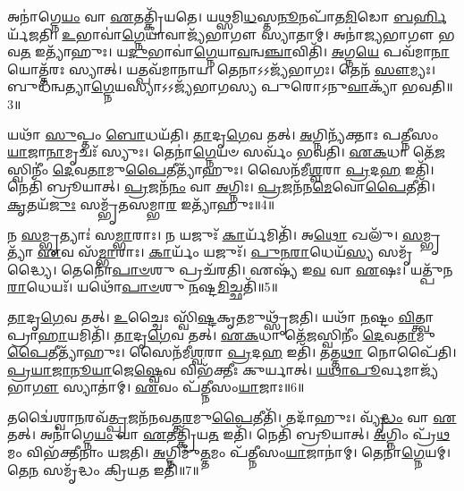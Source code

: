𑌅𑌨𑌾॑𑌗𑍍𑌨𑍇\-\ul{𑌯𑌂} 𑌵𑌾 \ul{𑌏}\-𑌤𑌤𑍍𑌕𑍍𑌰𑌿᳴𑌯𑌤𑍇।
𑌯\-\ul{𑌥𑍍𑌸}\-𑌮𑌿\-\ul{𑌧}\-𑌸𑍍𑌤\-\ul{𑌨𑍂}\-𑌨𑌪𑌾᳴𑌤\-\ul{𑌮𑌿}\-𑌡𑍋 \ul{𑌬}\-\-\ul{𑌰𑍍}\-\mbox{}𑌹𑌿𑌰𑍍𑌯᳴𑌜𑌤𑌿।
\-\ul{𑌉}\-𑌭𑌾𑌵𑌾॑\-\ul{𑌗𑍍𑌨𑍇}\-𑌯𑌾𑌵𑌾𑌜𑍍𑌯᳴𑌭𑌾𑌗𑍗 𑌸𑍍𑌯𑌾𑌤𑌾𑌮𑍍।
𑌅𑌨𑌾॑𑌜𑍍𑌯𑌭𑌾𑌗𑍗 𑌭𑌵\-\ul{𑌤} 𑌇𑌤𑍍𑌯𑌾᳴𑌹𑍁𑌃।
𑌯\-\ul{𑌦𑍁}\-𑌭𑌾𑌵𑌾॑\-\ul{𑌗𑍍𑌨𑍇}\-𑌯𑌾\-\ul{𑌵}\-𑌨𑍍𑌵\-\ul{𑌞𑍍𑌚𑌾}\-𑌵𑌿𑌤𑌿᳴।
\-\ul{𑌅}\-𑌗𑍍𑌨\-\ul{𑌯𑍇} 𑌪𑌵᳴𑌮𑌾\-\ul{𑌨𑌾}\-𑌯𑍋𑌤𑍍𑌤᳴𑌰𑌃 𑌸𑍍𑌯𑌾𑌤𑍍।
𑌯𑌤𑍍𑌪𑌵᳴𑌮𑌾𑌨𑌾𑌯।
𑌤𑍇𑌨𑌾𑌽𑌽𑌜𑍍𑌯᳴𑌭𑌾𑌗𑌃।
𑌤𑍇𑌨᳴ \ul{𑌸𑍗}\-𑌮𑍍𑌯𑌃।
𑌬𑍁𑌧᳴𑌨𑍍𑌵𑌤𑍍𑌯𑌾\-\ul{𑌗𑍍𑌨𑍇}\-𑌯𑌸𑍍𑌯𑌾𑌽𑌽𑌜𑍍𑌯᳴𑌭𑌾𑌗𑌸𑍍𑌯 𑌪𑍁𑌰𑍋\-𑌽𑌨𑍁\-\ul{𑌵𑌾}\-𑌕𑍍𑌯𑌾᳴ 𑌭𑌵𑌤𑌿॥3॥

𑌯𑌥𑌾᳴ \ul{𑌸𑍁}\-𑌪𑍍𑌤𑌂 \ul{𑌬𑍋}\-𑌧𑌯᳴𑌤𑌿।
\-\ul{𑌤𑌾}\-𑌦𑍃\-\ul{𑌗𑍇}\-𑌵 𑌤𑌤𑍍।
\-\ul{𑌅}\-𑌗𑍍𑌨𑌿𑌨𑍍𑌯᳴𑌕𑍍𑌤𑌾𑌃 𑌪𑌤𑍍𑌨𑍀𑌸𑌂\-\ul{𑌯𑌾}\-𑌜𑌾\-\ul{𑌨𑌾}\-𑌮𑍃𑌚𑌃᳴ 𑌸𑍍𑌯𑍁𑌃।
𑌤𑍇𑌨𑌾॑\-\ul{𑌗𑍍𑌨𑍇}\-𑌯𑍞 𑌸𑌰𑍍𑌵𑌂᳴ 𑌭𑌵𑌤𑌿।
\-\ul{𑌏}\-\-\ul{𑌕}\-𑌧𑌾 𑌤𑍇᳴\-\ul{𑌜}\-𑌸𑍍𑌵𑌿𑌨𑍀𑌂॑ \ul{𑌦𑍇}\-𑌵\-\ul{𑌤𑌾}\-𑌮𑍁\-\ul{𑌪𑍈}\-𑌤𑍀𑌤𑍍𑌯𑌾᳴𑌹𑍁𑌃।
𑌸𑍈𑌨᳴𑌮𑍀\-\ul{𑌶𑍍𑌵}\-𑌰𑌾 \ul{𑌪𑍍𑌰}\-𑌦\-\ul{𑌹} 𑌇𑌤𑌿᳴।
𑌨𑍇𑌤𑌿᳴ 𑌬𑍍𑌰𑍂𑌯𑌾𑌤𑍍।
\-\ul{𑌪𑍍𑌰}\-𑌜𑌨᳴\-\ul{𑌨𑌂} 𑌵𑌾 \ul{𑌅}\-𑌗𑍍𑌨𑌿𑌃।
\-\ul{𑌪𑍍𑌰}\-𑌜𑌨᳴𑌨\-\ul{𑌮𑍇}\-𑌵𑍋\-\ul{𑌪𑍈}\-𑌤𑍀𑌤𑌿᳴।
\-\ul{𑌕𑍃}\-𑌤𑌯᳴\-\ul{𑌜𑍁𑌃} 𑌸𑌮𑍍𑌭𑍃᳴𑌤𑌸𑌮𑍍𑌭𑌾\-\ul{𑌰} 𑌇𑌤𑍍𑌯𑌾᳴𑌹𑍁𑌃॥4॥

𑌨 \ul{𑌸}\-𑌮𑍍𑌭𑍃𑌤𑍍𑌯𑌾𑌃॑ 𑌸\-\ul{𑌮𑍍𑌭𑌾}\-𑌰𑌾𑌃।
𑌨 𑌯𑌜𑍁𑌃᳴ \ul{𑌕𑌾}\-𑌰𑍍𑌯᳴𑌮𑌿𑌤𑌿᳴।
𑌅\-\ul{𑌥𑍋} 𑌖𑌲𑍁᳴।
\-\ul{𑌸}\-𑌮𑍍𑌭𑍃𑌤𑍍𑌯𑌾᳴ \ul{𑌏}\-𑌵 𑌸᳴\-\ul{𑌮𑍍𑌭𑌾}\-𑌰𑌾𑌃।
\-\ul{𑌕𑌾}\-𑌰𑍍𑌯𑌂᳴ 𑌯𑌜𑍁𑌃᳴।
\-\ul{𑌪𑍁}\-\-\ul{𑌨}\-\-\ul{𑌰𑌾}\-𑌧𑍇𑌯᳴\-\ul{𑌸𑍍𑌯} 𑌸𑌮𑍃᳴𑌦𑍍𑌧𑍍𑌯𑍈।
𑌤𑍇𑌨𑍋᳴\-\ul{𑌪𑌾}\-\-\ul{𑍞}\-𑌶𑍁 𑌪𑍍𑌰𑌚᳴𑌰𑌤𑌿।
𑌏𑌷𑍍𑌯᳴ 𑌇\-\ul{𑌵} 𑌵𑌾 \ul{𑌏}\-𑌷𑌃।
𑌯𑌤𑍍𑌪𑍁᳴𑌨\-\ul{𑌰𑌾}\-𑌧𑍇𑌯𑌃᳴।
𑌯𑌥𑍋᳴\-\ul{𑌪𑌾}\-\-\ul{𑍞}\-𑌶𑍁 \ul{𑌨}\-𑌷𑍍𑌟\-\ul{𑌮𑌿}\-𑌚𑍍𑌛𑌤𑌿᳴॥5॥

\-\ul{𑌤𑌾}\-𑌦𑍃\-\ul{𑌗𑍇}\-𑌵 𑌤𑌤𑍍।
\-\ul{𑌉}\-𑌚𑍍𑌚𑍈𑌃 𑌸𑍍𑌵𑌿᳴\-\ul{𑌷𑍍𑌟}\-𑌕𑍃\-\ul{𑌤}\-𑌮𑍁𑌥𑍍𑌸𑍃᳴𑌜𑌤𑌿।
𑌯𑌥𑌾᳴ \ul{𑌨}\-𑌷𑍍𑌟𑌂 \ul{𑌵𑌿}\-𑌤𑍍𑌤𑍍𑌵𑌾 𑌪𑍍𑌰𑌾\-\ul{𑌹𑌾}\-𑌯𑌮𑌿𑌤𑌿᳴।
\-\ul{𑌤𑌾}\-𑌦𑍃\-\ul{𑌗𑍇}\-𑌵 𑌤𑌤𑍍।
\-\ul{𑌏}\-\-\ul{𑌕}\-𑌧𑌾 𑌤𑍇᳴\-\ul{𑌜}\-𑌸𑍍𑌵𑌿𑌨𑍀𑌂॑ \ul{𑌦𑍇}\-𑌵\-\ul{𑌤𑌾}\-𑌮𑍁\-\ul{𑌪𑍈}\-𑌤𑍀𑌤𑍍𑌯𑌾᳴𑌹𑍁𑌃।
𑌸𑍈𑌨᳴𑌮𑍀\-\ul{𑌶𑍍𑌵}\-𑌰𑌾 \ul{𑌪𑍍𑌰}\-𑌦\-\ul{𑌹} 𑌇𑌤𑌿᳴।
𑌤𑌤𑍍𑌤\-\ul{𑌥𑌾} 𑌨𑍋𑌪𑍈᳴𑌤𑌿।
\-\ul{𑌪𑍍𑌰}\-\-\ul{𑌯𑌾}\-\-\ul{𑌜𑌾}\-\-\ul{𑌨𑍂}\-\-\ul{𑌯𑌾}\-𑌜𑍇\-\ul{𑌷𑍍𑌵𑍇}\-𑌵 𑌵𑌿𑌭᳴𑌕𑍍𑌤𑍀𑌃 𑌕𑍁𑌰𑍍𑌯𑌾𑌤𑍍।
\-\ul{𑌯}\-\-\ul{𑌥𑌾}\-\-\ul{𑌪𑍂}\-𑌰𑍍𑌵𑌮𑌾𑌜𑍍𑌯᳴𑌭𑌾\-\ul{𑌗𑍗} 𑌸𑍍𑌯𑌾𑌤𑌾॑𑌮𑍍।
\-\ul{𑌏}\-𑌵𑌂 𑌪᳴𑌤𑍍𑌨𑍀𑌸𑌂\-\ul{𑌯𑌾}\-𑌜𑌾𑌃॥6॥

𑌤𑌦𑍍𑌵𑍈॑𑌶𑍍𑌵𑌾\-\ul{𑌨}\-𑌰𑌵᳴\-\ul{𑌤𑍍𑌪𑍍𑌰}\-𑌜𑌨᳴𑌨𑌵𑌤𑍍𑌤\-\ul{𑌰}\-𑌮𑍁\-\ul{𑌪𑍈}\-𑌤𑍀𑌤𑌿᳴।
𑌤𑌦𑌾᳴𑌹𑍁𑌃।
𑌵𑍍𑌯𑍃᳴\-\ul{𑌦𑍍𑌧𑌂} 𑌵𑌾 \ul{𑌏}\-𑌤𑌤𑍍।
𑌅𑌨𑌾॑𑌗𑍍𑌨𑍇\-\ul{𑌯𑌂} 𑌵𑌾 \ul{𑌏}\-𑌤𑌤𑍍𑌕𑍍𑌰𑌿᳴𑌯\-\ul{𑌤} 𑌇𑌤𑌿᳴।
𑌨𑍇𑌤𑌿᳴ 𑌬𑍍𑌰𑍂𑌯𑌾𑌤𑍍।
\-\ul{𑌅}\-𑌗𑍍𑌨𑌿𑌂 𑌪𑍍𑌰᳴\-\ul{𑌥}\-𑌮𑌂 𑌵𑌿𑌭᳴𑌕𑍍𑌤𑍀𑌨𑌾𑌂 𑌯𑌜𑌤𑌿।
\-\ul{𑌅}\-𑌗𑍍𑌨𑌿𑌮𑍁᳴\-\ul{𑌤𑍍𑌤}\-𑌮𑌂 𑌪᳴𑌤𑍍𑌨𑍀𑌸𑌂\-\ul{𑌯𑌾}\-𑌜𑌾𑌨𑌾॑𑌮𑍍।
𑌤𑍇𑌨𑌾॑\-\ul{𑌗𑍍𑌨𑍇}\-𑌯𑌮𑍍।
𑌤𑍇\-\ul{𑌨} 𑌸𑌮𑍃᳴𑌦𑍍𑌧𑌂 𑌕𑍍𑌰𑌿𑌯\-\ul{𑌤} 𑌇𑌤𑌿᳴॥7॥\anuvakamend[\-\ul{𑌅}\-\-\ul{𑌰𑍁}\-\-\ul{𑌨𑍍𑌧}\-\-\ul{𑌤𑍈}\-𑌵 𑌤𑌦𑍍𑌭᳴𑌵\-\ul{𑌤𑌿} 𑌸𑌮𑍍𑌭𑍃᳴𑌤𑌸𑌮𑍍𑌭𑌾\-\ul{𑌰} 𑌇𑌤𑍍𑌯𑌾᳴𑌹𑍁\-\ul{𑌰𑌿}\-𑌚𑍍𑌛𑌤𑌿᳴ 𑌪𑌤𑍍𑌨𑍀𑌸𑌂\-\ul{𑌯𑌾}\-𑌜𑌾 𑌨𑌵᳴ 𑌚]

